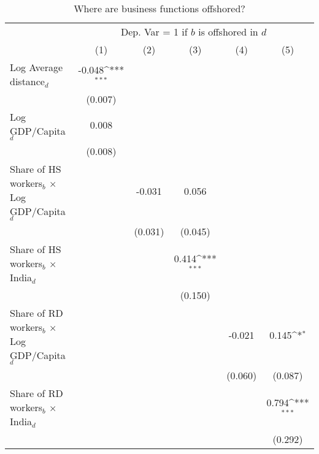 \begin{table}[htbp] \footnotesize \centering
\def\sym#1{\ifmmode^{#1}\else\(^{#1}\)\fi}
\caption{Where are business functions offshored? \label{tab:reg_where_paper}}
\renewcommand{\arraystretch}{1}
\begin{tabular}{l*{5}{c}}
\toprule
&\multicolumn{5}{c}{Dep. Var = 1 if $ b $ is offshored in $ d $} \\
\cmidrule(lr){2-6}
                &\multicolumn{1}{c}{(1)}         &\multicolumn{1}{c}{(2)}         &\multicolumn{1}{c}{(3)}         &\multicolumn{1}{c}{(4)}         &\multicolumn{1}{c}{(5)}         \\
\midrule
Log Average distance$ _d$&   -0.048\sym{***}&                  &                  &                  &                  \\
                &  (0.007)         &                  &                  &                  &                  \\
\addlinespace
Log GDP/Capita$ _d$&    0.008         &                  &                  &                  &                  \\
                &  (0.008)         &                  &                  &                  &                  \\
\addlinespace
Share of HS workers$ _b$ $\times$ Log GDP/Capita$ _d$&                  &   -0.031         &    0.056         &                  &                  \\
                &                  &  (0.031)         &  (0.045)         &                  &                  \\
\addlinespace
Share of HS workers$ _b$ $\times$ India$ _d$&                  &                  &    0.414\sym{***}&                  &                  \\
                &                  &                  &  (0.150)         &                  &                  \\
\addlinespace
Share of RD workers$ _b$ $\times$ Log GDP/Capita$ _d$&                  &                  &                  &   -0.021         &    0.145\sym{*}  \\
                &                  &                  &                  &  (0.060)         &  (0.087)         \\
\addlinespace
Share of RD workers$ _b$ $\times$ India$ _d$&                  &                  &                  &                  &    0.794\sym{***}\\
                &                  &                  &                  &                  &  (0.292)         \\

\end{tabular}
\end{table}
